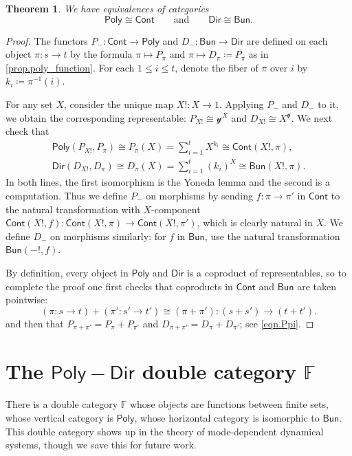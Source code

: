 \documentclass[11pt, article, one side]{memoir}
\theoremstyle{theorem}
\newtheorem{theorem}[equation]{Theorem}
\theoremstyle{definition}
\theoremstyle{remark}
\newcommand{\Cat}[1]{\mathsf{#1}}%
\newcommand{\inv}{^{-1}}
\newcommand{\cont}{\Cat{Cont}}
\newcommand{\bun}{\Cat{Bun}}
\newcommand{\yon}{\mathcal{y}}
\newcommand{\poly}{\Cat{Poly}}
\newcommand{\dir}{\Cat{Dir}}
\newcommand{\ff}{\mathbb{F}}
\newcommand{\qqand}{\qquad\text{and}\qquad}
\begin{document}
\begin{theorem}
We have equivalences of categories
\[
\poly\cong\cont
\qqand
\dir\cong\bun.
\]
\end{theorem}
\begin{proof}
The functors $P_-\colon\cont\to\poly$ and $D_-\colon\bun\to\dir$ are defined on each object $\pi\colon s\to t$ by the formula $\pi\mapsto P_\pi$ and $\pi\mapsto D_\pi\coloneqq\overline{P_\pi}$ as in \cref{prop.poly_function}. For each $1\leq i\leq t$, denote the fiber of $\pi$ over $i$ by $k_i\coloneqq\pi\inv(i)$.

For any set $X$, consider the unique map $X!\colon X\to 1$. Applying $P_-$ and $D_-$ to it, we obtain the corresponding representable: $P_{X!}\cong\yon^X$ and $D_{X!}\cong X^\yon$. We next check that
 \begin{gather*}
  \poly(P_{X!},P_\pi)\cong 
  P_\pi(X)=
  \sum_{i=1}^{t}X^{k_i}\cong
  \cont(X!, \pi),
  \\
  \dir(D_{X!}, D_\pi)\cong 
  D_\pi(X)=
  \sum_{i=1}^{t}(k_i)^X\cong
  \bun(X!, \pi).
\end{gather*}
In both lines, the first isomorphism is the Yoneda lemma and the second is a computation. Thus we define $P_-$ on morphisms by sending $f\colon\pi\to\pi'$ in $\cont$ to the natural transformation with $X$-component $\cont(X!,f)\colon\cont(X!,\pi)\to\cont(X!,\pi')$, which is clearly natural in $X$. We define $D_-$ on morphisms similarly: for $f$ in $\bun$, use the natural transformation $\bun(-!,f)$.

By definition, every object in $\poly$ and $\dir$ is a coproduct of representables, so to complete the proof one first checks that coproducts in $\cont$ and $\bun$ are taken pointwise:
\[
(\pi\colon s\to t)+(\pi'\colon s'\to t')\cong(\pi+\pi')\colon (s+s')\to (t+t').
\]
and then that $P_{\pi+\pi'}=P_\pi+P_{\pi'}$ and $D_{\pi+\pi'}=D_\pi+D_{\pi'}$; see \cref{eqn.Ppi}.
\end{proof}

\chapter{The $\poly-\dir$ double category $\ff$}

There is a double category $\ff$ whose objects are functions between finite sets, whose vertical category is $\poly$, whose horizontal category is isomorphic to $\bun$. This double category shows up in the theory of mode-dependent dynamical systems, though we save this for future work.
\end{document}
